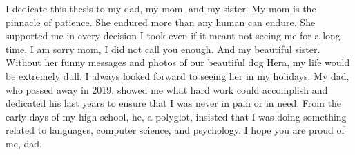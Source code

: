 I dedicate this thesis to my dad, my mom, and my sister. My mom is the pinnacle of patience. She endured more than any human can endure. She supported me in every decision I took even if it meant not seeing me for a long time. I am sorry mom, I did not call you enough. And my beautiful sister. Without her funny messages and photos of our beautiful dog Hera, my life would be extremely dull. I always looked forward to seeing her in my holidays. My dad, who passed away in 2019, showed me what hard work could accomplish and dedicated his last years to ensure that I was never in pain or in need. From the early days of my high school, he, a polyglot, insisted that I was doing something related to languages, computer science, and psychology. I hope you are proud of me, dad. 
